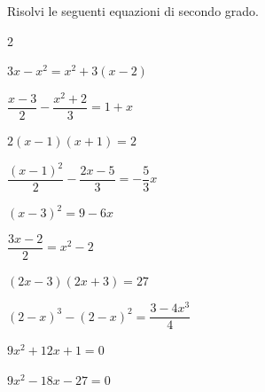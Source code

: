 \begin{esercizio}[*]
\label{ese:3.25}
Risolvi le seguenti equazioni di secondo grado.
\begin{htmulticols}{2}
\begin{enumeratea}
\item \(3 x-x^{2} = x^{2} + 3 (x-2)\)
\item \(\dfrac{x-3}{2}-\dfrac{x^{2} + 2}{3} = 1 + x\)
\sol{\emptyset}
\item \(2 (x-1) (x + 1) = 2\)
\item \(\dfrac{(x-1)^{2}}{2}-\dfrac{2 x-5}{3} =-\dfrac{5}{3} x\)
\sol{\emptyset}
\item \((x-3)^{2} = 9-6 x\)
\item \(\dfrac{3 x-2}{2} = x^{2}-2\)
\item \((2 x-3) (2 x + 3) = 27\)
\item \((2-x)^{3}-(2-x)^{2} = \dfrac{3-4 x^{3}}{4}\)
\sol{\emptyset}
\item \(9 x^{2} + 12 x + 1 = 0\)
\item \(9x^{2} -18x -27 = 0\)
\end{enumeratea}
\end{htmulticols}
\end{esercizio}

